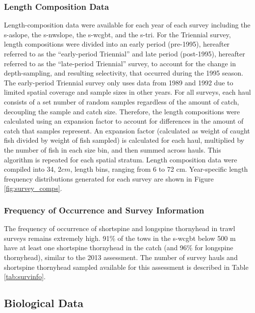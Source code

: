\documentclass[11pt,
  english,
  letterpaper,
]{article}
\begin{document}
\hypertarget{length-composition-data}{%
\subsubsection{Length Composition Data}\label{length-composition-data}}

Length-composition data were available for each year of each survey including the \gls{s-aslope}, the \gls{s-nwslope}, the \gls{s-wcgbt}, and the \gls{s-tri}. For the Triennial survey, length compositions were divided into an early period (pre-1995), hereafter referred to as the ``early-period Triennial'' and late period (post-1995), hereafter referred to as the ``late-period Triennial'' survey, to account for the change in depth-sampling, and resulting selectivity, that occurred during the 1995 season. The early-period Triennial survey only uses data from 1989 and 1992 due to limited spatial coverage and sample sizes in other years. For all surveys, each haul consists of a set number of random samples regardless of the amount of catch, decoupling the sample and catch size. Therefore, the length compositions were calculated using an expansion factor to account for differences in the amount of catch that samples represent. An expansion factor (calculated as weight of caught fish divided by weight of fish sampled) is calculated for each haul, multiplied by the number of fish in each size bin, and then summed across hauls. This algorithm is repeated for each spatial stratum. Length composition data were compiled into 34, \(2 cm\), length bins, ranging from 6 to 72 cm. Year-specific length frequency distributions generated for each survey are shown in Figure \ref{fig:survey_comps}.

\hypertarget{frequency-of-occurrence-and-survey-information}{%
\subsubsection{Frequency of Occurrence and Survey Information}\label{frequency-of-occurrence-and-survey-information}}

The frequency of occurrence of shortspine and longspine thornyhead in trawl surveys remains extremely high. 91\% of the tows in the \gls{s-wcgbt} below 500 m have at least one shortspine thornyhead in the catch (and 96\% for longspine thornyhead), similar to the 2013 assessment. The number of survey hauls and shortspine thornyhead sampled available for this assessment is described in Table \ref{tab:survinfo}.

\hypertarget{biological-data}{%
\subsection{Biological Data}\label{biological-data}}
\end{document}
